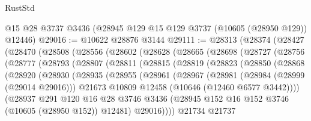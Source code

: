 \begin{lexlean}{RustStd}
\begin{coremodule}
    @15
    @28
    @3737
    @3436
    (@28945 @129 @15 @129 @3737 (@10605 (@28950 @129)) @12446)
@29016 := @10622 @28876 @3144
@29111 := @28313
    (@28374
      (@28427
        (@28470
          (@28508
            (@28556
              (@28602
                (@28628
                  (@28665
                    (@28698
                      (@28727
                        (@28756
                          (@28777
                            (@28793
                              (@28807
                                (@28811
                                  (@28815
                                    (@28819
                                      (@28823
                                        (@28850
                                          (@28868
                                            (@28920
                                              (@28930
                                                (@28935
                                                  (@28955
                                                    (@28961
                                                      (@28967
                                                        (@28981
                                                          (@28984 (@28999 (@29014 @29016)))
                                                          @21673
                                                          @10809
                                                          @12458
                                                          (@10646 (@12460 @6577 @3442))))
                                                      (@28937
                                                        @291
                                                        @120
                                                        @16
                                                        @28
                                                        @3746
                                                        @3436
                                                        (@28945
                                                          @152
                                                          @16
                                                          @152
                                                          @3746
                                                          (@10605 (@28950 @152))
                                                          @12481)
                                                        @29016))))
                                                @21734
                                                @21737

\end{coremodule}
\end{lexlean}
